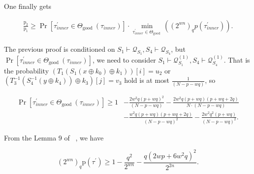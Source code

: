 One finally gets

\begin{equation}
\begin{aligned}
\frac{\mathrm{p}_{2}}{\mathrm{p}_{1}} \geq \operatorname{Pr}\left[ \tau_{inner}^{\prime} \in \Theta_{\text {good }}(\tau_{inner})\right] \cdot \min _{\tau_{inner}^{\prime} \in \Theta_{\text {good }}}((2^{w n})_{q} p(\tau_{inner}^{\prime})).
\end{aligned}
\end{equation}

The previous proof is conditioned on $S_{1} \vdash \mathcal{Q}_{S_{1}}, S_{4} \vdash \mathcal{Q}_{S_{4}}$, but $\operatorname{Pr}\left[ \tau_{inner}^{\prime} \in \Theta_{\text {good }}(\tau_{inner})\right]$, we need to consider $S_{1} \vdash \mathcal{Q}_{S_{1}}^{(1)}, S_{4} \vdash \mathcal{Q}_{S_{4}}^{(1)}$. That is the probability $\left(T_{1}\left(S_{1}\left(x \oplus k_{0}\right) \oplus k_{1}\right)\right)[i]=u_2$ or $\left(T_{3}^{-1}\left(S_{4}^{-1}\left(y \oplus k_{4}\right)\right) \oplus k_{3}\right)[j]=v_3$ hold is at most $\frac{1}{(N-p-w q)}$, so

\begin{equation}
\begin{aligned}
\operatorname{Pr}\left[ \tau_{inner}^{\prime} \in \Theta_{\text {good }}(\tau_{inner})\right] \geq 1&- \frac{2 w^{2} q (p+w q)^{2}}{(N-p-w q)} -\frac{2 w^{2} q (p+w q)(p+w q+2 q)}{N \cdot (N-p-w q)}\\
&- \frac{w^{2} q (p+w q)(p+w q+2 q)}{(N-p-w q)^2} - \frac{2 w^{2} q^{2} (p+w q)}{(N- p- wq)^2}.
\end{aligned}
\end{equation}


From the Lemma 9 of ~\cite{cogliati2018wide}, we have

$$
\left(2^{w n}\right)_{q} \mathrm{p}\left(\tau^{\prime}\right) \geq 1-\frac{q^{2}}{2^{w n}}-\frac{q\left(2 w p+6 w^{2} q\right)^{2}}{2^{2 n}}.
$$

